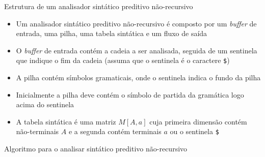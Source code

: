 \begin{frame}[fragile]{Estrutura de um analisador sintático preditivo não-recursivo}

    \begin{itemize}
        \item Um analisador sintático preditivo não-recursivo é composto por um \textit{buffer} de entrada, uma pilha, uma tabela sintática e um fluxo de saída
        \pause

        \item O \textit{buffer} de entrada contém a cadeia a ser analisada, seguida de um sentinela que indique o fim da cadeia (assuma que o sentinela é o
            caractere \texttt{\$})
        \pause

        \item A pilha contém símbolos gramaticais, onde o sentinela indica o fundo da pilha
        \pause

        \item Inicialmente a pilha deve contém o símbolo de partida da gramática logo acima do sentinela
        \pause
    
        \item A tabela sintática é uma matriz $M[A, a]$ cuja primeira dimensão contém não-terminais $A$ e a segunda contém terminais $a$ ou o sentinela
            \texttt{\$}
    \end{itemize}

\end{frame}

\begin{frame}[fragile]{Algoritmo para o analisar sintático preditivo não-recursivo}

    \begin{algorithmic}[1]

        \vspace{0.1in}

        \Repeat
                \Else
                \EndIf
    \end{algorithmic}

\end{frame}

